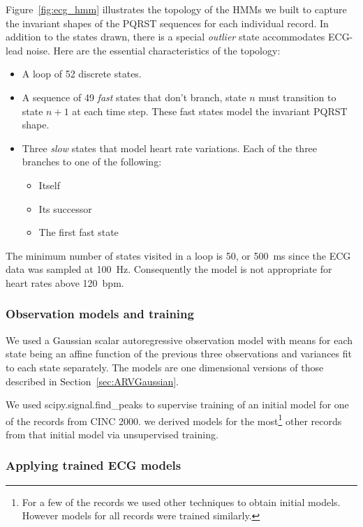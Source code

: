 Figure~\ref{fig:ecg_hmm} illustrates the topology of the HMMs we built
to capture the invariant shapes of the PQRST sequences for each
individual record.  In addition to the states drawn, there is a
special \emph{outlier} state accommodates ECG-lead noise.  Here are
the essential characteristics of the topology:
\begin{itemize}
\item A loop of 52 discrete states.
\item A sequence of 49 \emph{fast} states that don't branch, state $n$ must
  transition to state $n+1$ at each time step.  These fast states
  model the invariant PQRST shape.
\item Three \emph{slow} states that model heart rate variations.
  Each of the three branches to one of the following:
  \begin{itemize}
  \item Itself
  \item Its successor
  \item The first fast state
  \end{itemize}
\end{itemize}
The minimum number of states visited in a loop is 50, or 500~ms since
the ECG data was sampled at 100~Hz.  Consequently the model is not
appropriate for heart rates above 120~bpm.

\subsubsection{Observation models and training}
\label{sec:ecg_training}

We used a Gaussian scalar autoregressive observation model with means
for each state being an affine function of the previous three
observations and variances fit to each state separately.  The models
are one dimensional versions of those described in
Section~\ref{sec:ARVGaussian}.

We used scipy.signal.find\_peaks to supervise training of an initial
model for one of the records from CINC 2000.  we derived models for
the most\footnote{For a few of the records we used other techniques to
  obtain initial models.  However models for all records were trained
  similarly.} other records from that initial model via unsupervised
training.

\subsubsection{Applying trained ECG models}
\label{sec:applying_ECG_models}

